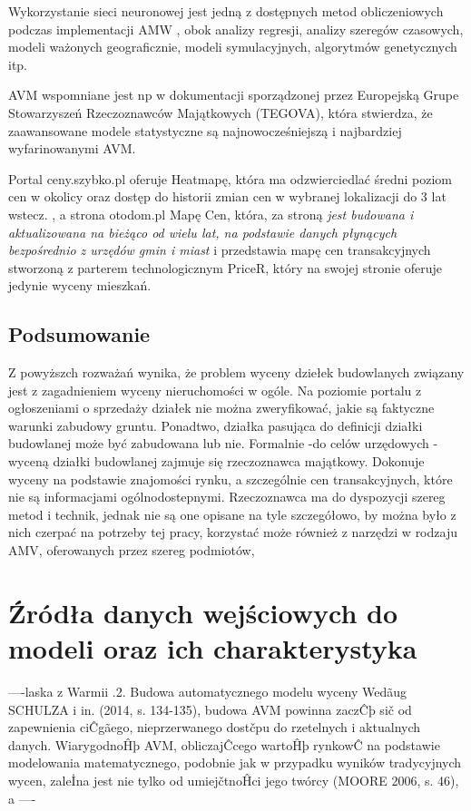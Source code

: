\documentclass[a4paper,12pt,twoside,openany]{report}
\begin{document}
Wykorzystanie sieci neuronowej jest jedną z dostępnych metod obliczeniowych podczas implementacji AMW \cite{AVMFigurska}, obok analizy regresji, analizy szeregów czasowych, modeli ważonych geograficznie, modeli symulacyjnych, algorytmów genetycznych itp. \cite{AMVbilozor}


\cite{szybko}AVM wspomniane jest np w dokumentacji sporządzonej przez Europejską Grupe Stowarzyszeń Rzeczoznawców Majątkowych (TEGOVA), która stwierdza, że zaawansowane modele statystyczne są najnowocześniejszą i najbardziej wyfarinowanymi AVM. \cite{AVM} 


Portal ceny.szybko.pl oferuje Heatmapę, która ma odzwierciedlać średni poziom cen w okolicy oraz dostęp do historii zmian cen w wybranej lokalizacji do 3 lat wstecz. \cite{szybko}, a strona otodom.pl Mapę Cen, która, za stroną \textit{jest budowana i aktualizowana na bieżąco od wielu lat, na podstawie danych płynących bezpośrednio z urzędów gmin i miast}\cite{otodom} i przedstawia mapę cen transakcyjnych stworzoną z parterem technologicznym PriceR, który na swojej stronie  oferuje jedynie wyceny mieszkań. \cite{pricer}

\section{Podsumowanie}

Z powyższch rozważań wynika, że problem wyceny dziełek budowlanych związany jest z zagadnieniem wyceny nieruchomości w ogóle. 
Na poziomie portalu z ogłoszeniami o sprzedaży działek nie można zweryfikować, jakie są faktyczne warunki zabudowy gruntu.
Ponadtwo, działka pasująca do definicji działki budowlanej może być zabudowana lub nie.
Formalnie -do celów urzędowych - wyceną działki budowlanej zajmuje się rzeczoznawca majątkowy. Dokonuje wyceny na podstawie znajomości rynku, a szczególnie cen transakcyjnych, które nie są informacjami ogólnodostepnymi. Rzeczoznawca ma do dyspozycji szereg metod i technik, jednak nie są one opisane na tyle szczegółowo, by można było z nich czerpać na potrzeby tej pracy, korzystać może również z narzędzi w rodzaju AMV, oferowanych przez szereg podmiotów, 





\chapter{Źródła danych wejściowych do modeli oraz ich charakterystyka}
 ----laska z Warmii 
 .2. Budowa automatycznego modelu wyceny
Wedãug SCHULZA i in. (2014, s. 134-135), budowa AVM powinna zaczĈþ sič od zapewnienia ciĈgãego,
nieprzerwanego dostčpu do rzetelnych i aktualnych danych. WiarygodnoĤþ AVM, obliczajĈcego
wartoĤþ rynkowĈ na podstawie modelowania matematycznego, podobnie jak w przypadku wyników
tradycyjnych wycen, zaleİna jest nie tylko od umiejčtnoĤci jego twórcy (MOORE 2006, s. 46), a
 ----
\end{document}
